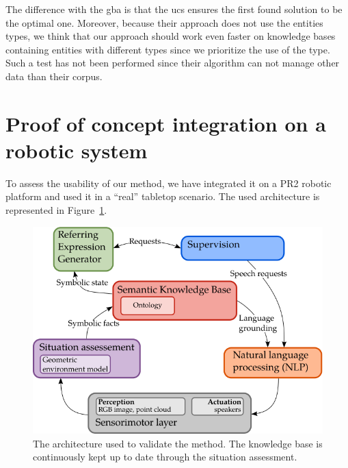 The difference with the \acrshort{gba} is that the \acrlong{ucs} ensures the first found solution to be the optimal one. Moreover, because their approach does not use the entities types, we think that our approach should work even faster on knowledge bases containing entities with different types since we prioritize the use of the type. Such a test has not been performed since their algorithm can not manage other data than their corpus.

\section[Integration on a robotic system]{Proof of concept integration on a robotic system}

To assess the usability of our method, we have integrated it on a PR2 robotic platform and used it in a ``real'' tabletop scenario. The used architecture is represented in Figure~\ref{fig:chap4_archi}.

\begin{figure}[ht!]
\centering
\includegraphics[scale=0.6]{figures/chapter4/architecture.png}
\caption{\label{fig:chap4_archi} The architecture used to validate the method. The knowledge base is continuously kept up to date through the situation assessment.}
\end{figure}

